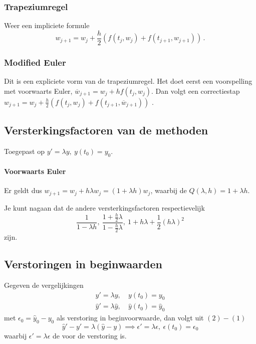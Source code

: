 \documentclass{2wn20summary}
\begin{document}
		\subsubsection{Trapeziumregel}
			Weer een impliciete formule
			\[
				w_{j+1} = w_j + \frac{h}{2} ( f(t_j,w_j) + f(t_{j+1},w_{j+1})) \,.
			 \]
		\subsubsection{Modified Euler}
			Dit is een expliciete vorm van de trapeziumregel. Het doet eerst een voorspelling met voorwaarts Euler, $\overline w_{j+1} = w_j + h f(t_j,w_j)$. Dan volgt een correctiestap $w_{j+1} = w_j + \frac{h}{2} (f(t_j,w_j) + f(t_{j+1},\overline w_{j+1}))$ .

		\subsection{Versterkingsfactoren van de methoden}
			Toegepast op $y'=\lambda y,\ y(t_0) = y_0$.
			\paragraph{Voorwaarts Euler}
				\begin{define}
				Er geldt dus $w_{j+1} = w_j + h \lambda w_j = (1+\lambda h) w_j$, waarbij de  $Q(\lambda,h) = 1+\lambda h$.
				\end{define}
			Je kunt nagaan dat de andere versterkingsfactoren respectievelijk
			\[
				\frac{1}{1-\lambda h},\ \frac{1+\frac{h}{2}\lambda}{1-\frac{h}{2}\lambda},\ 1+h\lambda + \frac{1}{2} (h\lambda)^2
				\]
				zijn.

		\subsection{Verstoringen in beginwaarden}
			\begin{define}
			Gegeven de vergelijkingen
			\begin{align}
				y'=\lambda y,\ & y(t_0) = y_0 \\
				\hat y' = \lambda \hat y,\ & \hat y (t_0) = \hat y_0
			\end{align}
			met $\epsilon_0 = \hat y_0 - y_0$ als verstoring in beginvoorwaarde, dan volgt uit $(2)-(1)$
			\[
				\hat y' - y'=\lambda (\hat y-y) \implies \epsilon'=\lambda \epsilon,\ \epsilon(t_0) = \epsilon_0
			 \]
			 waarbij $\epsilon'=\lambda \epsilon$ de  voor de verstoring is.
			 \end{define}
\end{document}
